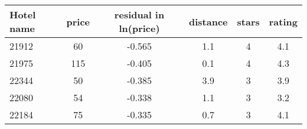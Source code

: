 \begin{tabular}{l c c c c c}
\hline
Hotel name & price & residual in ln(price) & distance & stars & rating \\
\hline
21912&60&-0.565&1.1&4&4.1\\
21975&115&-0.405&0.1&4&4.3\\
22344&50&-0.385&3.9&3&3.9\\
22080&54&-0.338&1.1&3&3.2\\
22184&75&-0.335&0.7&3&4.1\\
\hline
\end{tabular}
